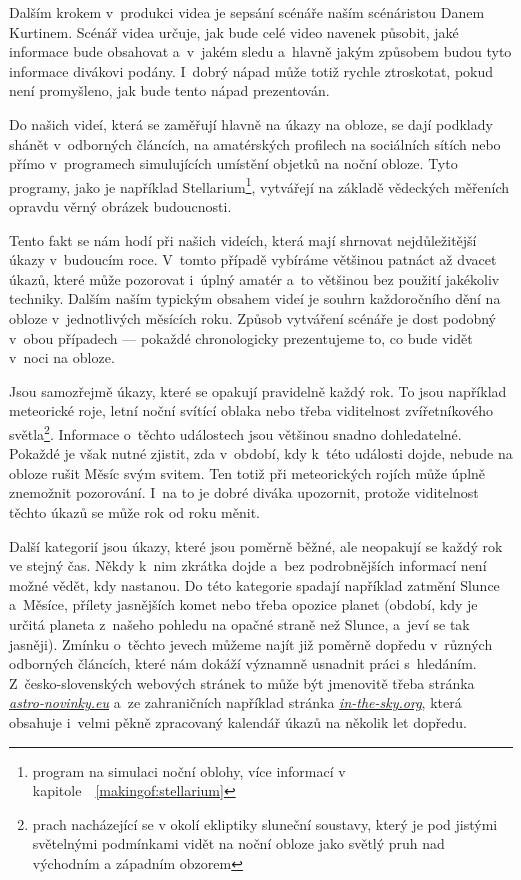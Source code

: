 \documentclass[12pt,a4paper,titlepage]{article}
\newcommand{\link}[2]{\href{#1}{\textcolor{link-color}{\textit{#2}}}}%
\begin{document}
Dalším krokem v~produkci videa je sepsání scénáře naším scénáristou Danem Kurtinem. Scénář videa určuje, jak bude celé video navenek působit, jaké informace bude obsahovat a~v~jakém sledu a~hlavně jakým způsobem budou tyto informace divákovi podány. I~dobrý nápad může totiž rychle ztroskotat, pokud není promyšleno, jak bude tento nápad prezentován.

Do našich videí, která se zaměřují hlavně na úkazy na obloze, se dají podklady shánět v~odborných článcích, na amatérských profilech na sociálních sítích nebo přímo v~programech simulujících umístění objetků na noční obloze. Tyto programy, jako je například Stellarium\footnote{program na simulaci noční oblohy, více informací v kapitole~~\ref{makingof:stellarium}}, vytvářejí na základě vědeckých měřeních opravdu věrný obrázek budoucnosti. 

Tento fakt se nám hodí při našich videích, která mají shrnovat nejdůležitější úkazy v~budoucím roce. V~tomto případě vybíráme většinou patnáct až dvacet úkazů, které může pozorovat i~úplný amatér a~to většinou bez použití jakékoliv techniky. Dalším naším typickým obsahem videí je souhrn každoročního dění na obloze v~jednotlivých měsících roku. Způsob vytváření scénáře je dost podobný v~obou případech --- pokaždé chronologicky prezentujeme to, co bude vidět v~noci na obloze.

Jsou samozřejmě úkazy, které se opakují pravidelně každý rok. To jsou například meteorické roje, letní noční svítící oblaka nebo třeba viditelnost zvířetníkového světla\footnote{prach nacházející se v okolí ekliptiky sluneční soustavy, který je pod jistými světelnými podmínkami vidět na noční obloze jako světlý pruh nad východním a západním obzorem}. Informace o~těchto událostech jsou většinou snadno dohledatelné. Pokaždé je však nutné zjistit, zda v~období, kdy k~této události dojde, nebude na obloze rušit Měsíc svým svitem. Ten totiž při meteorických rojích může úplně znemožnit pozorování. I~na to je dobré diváka upozornit, protože viditelnost těchto úkazů se může rok od roku měnit.

Další kategorií jsou úkazy, které jsou poměrně běžné, ale neopakují se každý rok ve stejný čas. Někdy k~nim zkrátka dojde a~bez podrobnějších informací není možné vědět, kdy nastanou. Do této kategorie spadají například zatmění Slunce a~Měsíce, přílety jasnějších komet nebo třeba opozice planet (období, kdy je určitá planeta z~našeho pohledu na opačné straně než Slunce, a~jeví se tak jasněji). Zmínku o~těchto jevech můžeme najít již poměrně dopředu v~různých odborných článcích, které nám dokáží významně usnadnit práci s~hledáním. Z~česko-slovenských webových stránek to může být jmenovitě třeba stránka \link{https://www.astro-novinky.eu}{astro-novinky.eu} a~ze zahraničních například stránka \link{https://in-the-sky.org}{in-the-sky.org}, která obsahuje i~velmi pěkně zpracovaný kalendář úkazů na několik let dopředu.
\end{document}
